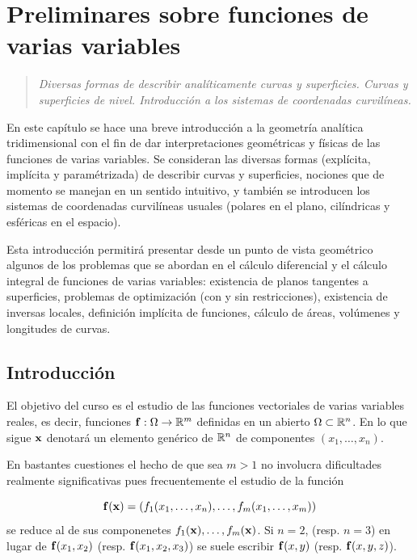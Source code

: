 
\chapter{Preliminares sobre funciones de varias variables}

\begin{quote}
    {\it Diversas formas de describir analíticamente curvas y superficies. Curvas y superficies de nivel. Introducción a los sistemas de coordenadas curvilíneas.}
\end{quote}

En este capítulo se hace una breve introducción a la geometría analítica tridimensional con el fin de dar interpretaciones geométricas y físicas de las funciones de varias variables. Se consideran las diversas formas (explícita, implícita y paramétrizada) de describir curvas y superficies, nociones que de momento se manejan en un sentido intuitivo, y también se introducen los sistemas de coordenadas curvilíneas usuales (polares en el plano, cilíndricas y esféricas en el espacio).

Esta introducción permitirá presentar desde un punto de vista geométrico algunos de los problemas que se abordan en el cálculo diferencial y el cálculo integral de funciones de varias variables: existencia de planos tangentes a superficies, problemas de optimización (con y sin restricciones), existencia de inversas locales, definición implícita de funciones, cálculo de áreas, volúmenes y longitudes de curvas.

\section{Introducción}

El objetivo del curso es el estudio de las funciones vectoriales de varias variables reales, es decir, funciones $\mathbf{f}:\Omega\rightarrow\mathbb{R}^m$ definidas en un abierto $\Omega\subset\mathbb{R}^n$. En lo que sigue $\mathbf{x}$ denotará un elemento genérico de $\mathbb{R}^n$ de componentes $(x_1,\dots,x_n)$.

En bastantes cuestiones el hecho de que sea $m>1$ no involucra dificultades realmente significativas pues frecuentemente el estudio de la función

$$\mathbf{f}(\mathbf{x})=\left(f_1(x_1,\dots,x_n),\dots,f_m(x_1,\dots,x_m)\right)$$
se reduce al de sus componenetes $f_1(\mathbf{x}),\dots,f_m(\mathbf{x})$. Si $n=2$, (resp. $n=3$) en lugar de $\mathbf{f}(x_1,x_2)$ (resp. $\mathbf{f}(x_1,x_2,x_3)$) se suele escribir $\mathbf{f}(x,y)$ (resp. $\mathbf{f}(x,y,z)$).

